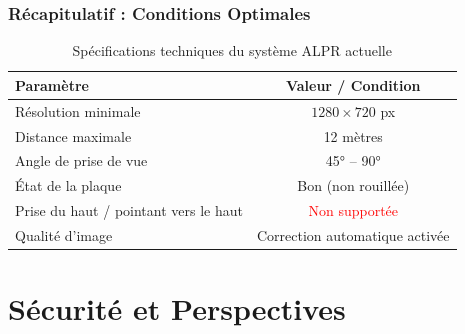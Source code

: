 \documentclass[
	11pt,
	aspectratio=169,
]{beamer}
\begin{document}

\begin{frame}
	\frametitle{Récapitulatif : Conditions Optimales}
	
	\begin{table}
		\centering
		\begin{tabular}{lc}
			\toprule
			\textbf{Paramètre} & \textbf{Valeur / Condition} \\
			\midrule
			Résolution minimale & $1280 \times 720$ px \\
			Distance maximale & 12 mètres \\
			Angle de prise de vue & 45° -- 90° \\
			État de la plaque & Bon (non rouillée) \\
			Prise du haut / pointant vers le haut & \textcolor{red}{Non supportée} \\
			Qualité d'image & Correction automatique activée \\
			\bottomrule
		\end{tabular}
		\caption{Spécifications techniques du système ALPR actuelle}
	\end{table}
\end{frame}


\section{Sécurité et Perspectives}
\end{document}
